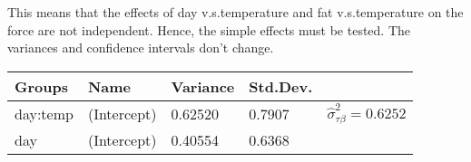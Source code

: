 \documentclass[12pt,]{article}
\begin{document}
This means that the effects of day v.s.temperature and fat
v.s.temperature on the force are not independent. Hence, the simple
effects must be tested. The variances and confidence intervals don't
change.

\begin{longtable}[]{@{}lllll@{}}
\toprule
\begin{minipage}[b]{0.10\columnwidth}\raggedright
Groups\strut
\end{minipage} & \begin{minipage}[b]{0.13\columnwidth}\raggedright
Name\strut
\end{minipage} & \begin{minipage}[b]{0.11\columnwidth}\raggedright
Variance\strut
\end{minipage} & \begin{minipage}[b]{0.11\columnwidth}\raggedright
Std.Dev.\strut
\end{minipage} & \begin{minipage}[b]{0.40\columnwidth}\raggedright
\strut
\end{minipage}\tabularnewline
\midrule
\endhead
\begin{minipage}[t]{0.10\columnwidth}\raggedright
day:temp\strut
\end{minipage} & \begin{minipage}[t]{0.13\columnwidth}\raggedright
(Intercept)\strut
\end{minipage} & \begin{minipage}[t]{0.11\columnwidth}\raggedright
0.62520\strut
\end{minipage} & \begin{minipage}[t]{0.11\columnwidth}\raggedright
0.7907\strut
\end{minipage} & \begin{minipage}[t]{0.40\columnwidth}\raggedright
\(\hat\sigma^2_{\tau\beta}=0.6252\)\strut
\end{minipage}\tabularnewline
\begin{minipage}[t]{0.10\columnwidth}\raggedright
day\strut
\end{minipage} & \begin{minipage}[t]{0.13\columnwidth}\raggedright
(Intercept)\strut
\end{minipage} & \begin{minipage}[t]{0.11\columnwidth}\raggedright
0.40554\strut
\end{minipage} & \begin{minipage}[t]{0.11\columnwidth}\raggedright
0.6368\strut
\end{minipage} & \begin{minipage}[t]{0.40\columnwidth}\raggedright

\end{minipage}
\end{longtable}
\end{document}
